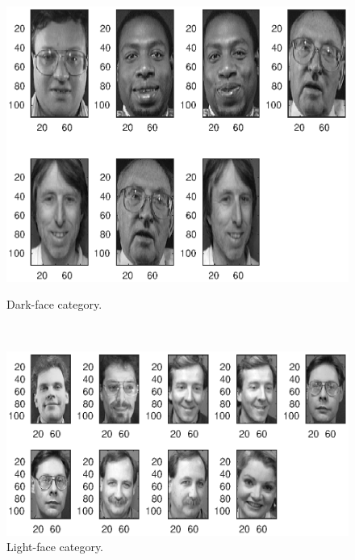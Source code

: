 \documentclass[a4paper,12pt]{article}
\theoremstyle{plain}
\theoremstyle{definition}
\begin{document}
      \begin{figure}[H]
         \vspace*{1cm}
         \hspace*{-2cm}
         \centering
         \begin{minipage}[t]{.6\textwidth}		
            \vspace{0pt}
            \centering
            \includegraphics[scale=.6]{8_distancedark}
            \caption{Dark-face category.}
            \label{fig:8_dark}
         \end{minipage}~\hspace*{1em}
         \begin{minipage}[t]{.6\textwidth}		
            \vspace{0pt}
            \centering
            \includegraphics[scale=.6, trim=1cm 0 0 0]{8_distancelight}
            \caption{Light-face category.}
            \label{fig:8_light}
         \end{minipage}
      \end{figure}
\end{document}
